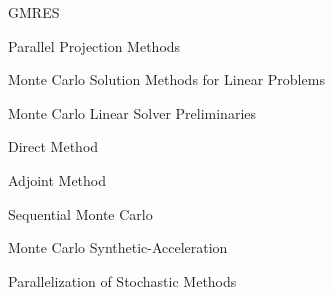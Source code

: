 \documentclass{beamer}
\begin{document}
\begin{frame}{GMRES}

\end{frame}

\begin{frame}{Parallel Projection Methods}

\end{frame}

\begin{frame}{Monte Carlo Solution Methods for Linear Problems}

\end{frame}

\begin{frame}{Monte Carlo Linear Solver Preliminaries}

\end{frame}

\begin{frame}{Direct Method}

\end{frame}

\begin{frame}{Adjoint Method}

\end{frame}

\begin{frame}{Sequential Monte Carlo}

\end{frame}

\begin{frame}{Monte Carlo Synthetic-Acceleration}

\end{frame}

\begin{frame}{Parallelization of Stochastic Methods}

\end{frame}
\end{document}
